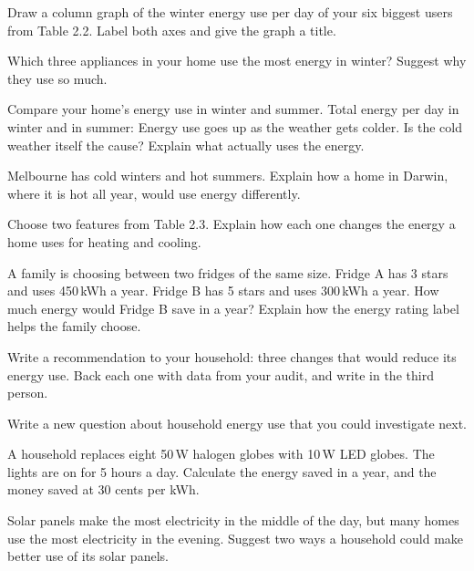 \task Draw a column graph of the winter energy use per day of your six biggest users from Table 2.2. Label both axes and give the graph a title. 
\graphgrid{9cm}


\task Which three appliances in your home use the most energy in winter? Suggest why they use so much. 
\answerbox{5cm}

\task Compare your home's energy use in winter and summer. 
Total energy per day in winter and in summer:
\workbox{3cm}
Energy use goes up as the weather gets colder. Is the cold weather itself the cause? Explain what actually uses the energy.
\answerbox{5cm}

\task Melbourne has cold winters and hot summers. Explain how a home in Darwin, where it is hot all year, would use energy differently.
\answerbox{5cm}

\task Choose two features from Table 2.3. Explain how each one changes the energy a home uses for heating and cooling.
\answerbox{5cm}

\task A family is choosing between two fridges of the same size. Fridge A has 3 stars and uses 450\,kWh a year. Fridge B has 5 stars and uses 300\,kWh a year. 
How much energy would Fridge B save in a year?
\workbox{2.5cm}
Explain how the energy rating label helps the family choose.
\answerbox{5cm}

\task Write a recommendation to your household: three changes that would reduce its energy use. Back each one with data from your audit, and write in the third person. 

\answerbox{8cm}

\task Write a new question about household energy use that you could investigate next. 
\answerbox{3cm}

\begin{yr8box}
\begin{keepext}
\exttask A household replaces eight 50\,W halogen globes with 10\,W LED globes. The lights are on for 5 hours a day. Calculate the energy saved in a year, and the money saved at 30 cents per kWh.
\workbox{4cm}
\end{keepext}
\begin{keepext}
\exttask Solar panels make the most electricity in the middle of the day, but many homes use the most electricity in the evening. Suggest two ways a household could make better use of its solar panels.
\answerbox{5cm}
\end{keepext}
\end{yr8box}

